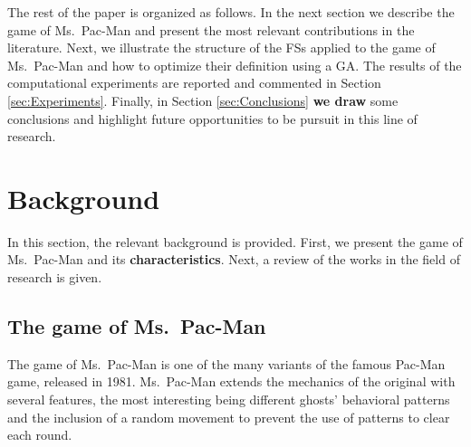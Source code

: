 \documentclass[journal]{IEEEtran}
\begin{document}
The rest of the paper is organized as follows. In the next section we describe the game of Ms.\  Pac-Man and present the most relevant contributions in the literature. Next, we illustrate the structure of the FSs applied to the game of Ms.\  Pac-Man and how to optimize their definition using a GA. The results of the computational experiments are reported and commented in Section \ref{sec:Experiments}. Finally, in Section \ref{sec:Conclusions} \textbf{we draw} some conclusions and highlight future opportunities to be pursuit in this line of research.

\section{Background}
\label{sec:Background}
In this section, the relevant background is provided. First, we present the game of Ms.\  Pac-Man and its \textbf{characteristics}. Next, a review of the works in the field of research is given.

\subsection{The game of Ms.\  Pac-Man}
\label{subsec:GameMsPacMan}
The game of Ms.\  Pac-Man is one of the many variants of the famous
Pac-Man game, released in 1981. Ms.\  Pac-Man  extends the mechanics of
the original with several features, the most interesting being
different ghosts' behavioral patterns and the inclusion of a random
movement to prevent the use of patterns to clear each round.
\end{document}
